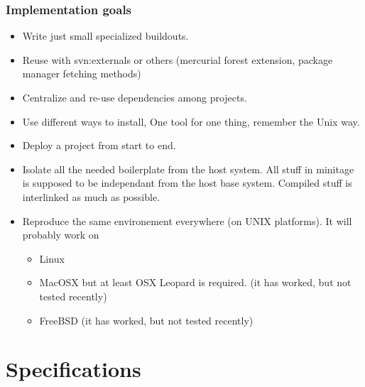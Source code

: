 \documentclass[letterpaper,10pt,english]{sphinxmanual}
\begin{document}
\subsubsection{Implementation goals}
\label{about:implementation-goals}\begin{itemize}
\item {} 
Write just small specialized buildouts.

\item {} 
Reuse with svn:externals or others (mercurial forest extension, package manager fetching methods)

\item {} 
Centralize and re-use dependencies among projects.

\item {} 
Use different ways to install, One tool for one thing, remember the Unix way.

\item {} 
Deploy a project from start to end.

\item {} 
Isolate all the needed boilerplate from the host system. All stuff in minitage is supposed to be independant from the host base system. Compiled stuff is interlinked as much as possible.

\item {} 
Reproduce the same environement everywhere (on UNIX platforms). It will probably work on
\begin{itemize}
\item {} 
Linux

\item {} 
MacOSX but at least OSX Leopard is required. (it has worked, but not tested recently)

\item {} 
FreeBSD (it has worked, but not tested recently)

\end{itemize}

\end{itemize}


\section{Specifications}
\label{spec:specifications}\label{spec::doc}
\end{document}
